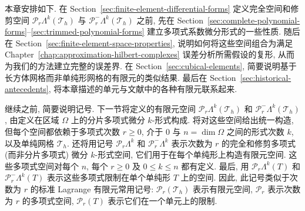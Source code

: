 本章安排如下. 在 Section~\ref{sec:finite-element-differential-forms} 定义完全空间和修剪空间 $\mathcal P_r\Lambda^k(\mathcal T_h)$ 与 $\mathcal P_r^-\Lambda^k(\mathcal T_h)$ 之前, 先在 Section~\ref{sec:complete-polynomial-forms}--\ref{sec:trimmed-polynomial-forms} 建立多项式系数微分形式的一些性质. 随后在 Section~\ref{sec:finite-element-space-properties}, 说明如何将这些空间组合为满足 Chapter~\ref{chap:approximation-hilbert-complexes} 误差分析所需假设的复形, 从而为我们的方法建立完整的误差界. 在 Section~\ref{sec:cubical-elements}, 简要说明基于长方体网格而非单纯形网格的有限元的类似结果. 最后在 Section~\ref{sec:historical-antecedents}, 将本章描述的单元与文献中的各种有限元联系起来.

继续之前, 简要说明记号. 下一节将定义的有限元空间 $\mathcal P_r\Lambda^k(\mathcal T_h)$ 和 $\mathcal P_r^-\Lambda^k(\mathcal T_h)$, 由定义在区域 $\Omega$ 上的分片多项式微分 $k$-形式构成. 将对这些空间给出统一构造, 但每个空间都依赖于多项式次数 $r\geq0$, 介于 $0$ 与 $n=\dim\Omega$ 之间的形式次数 $k$, 以及单纯网格 $\mathcal T_h$. 还将用记号 $\mathcal P_r\Lambda^k$ 和 $\mathcal P_r^-\Lambda^k$ 表示次数为 $r$ 的完全和修剪多项式 (而非分片多项式) 微分 $k$-形式空间, 它们用于在每个单纯形上构造有限元空间. 这些多项式空间对每个 $n$, 每个 $r\geq0$ 及 $0\leq k\leq n$ 都有定义. 最后, 用 $\mathcal P_r\Lambda^k(T)$ 和 $\mathcal P_r^-\Lambda^k(T)$ 表示这些多项式限制在单个单纯形 $T$ 上的空间. 因此, 此记号类似于次数为 $r$ 的标准 Lagrange 有限元常用记号: $\mathcal P_r(\mathcal T_h)$ 表示有限元空间, $\mathcal P_r$ 表示次数为 $r$ 的多项式空间, $\mathcal P_r(T)$ 表示它们在一个单元上的限制.
